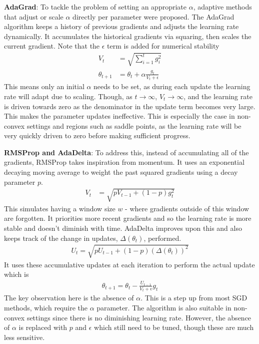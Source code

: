 \textbf{AdaGrad}: To tackle the problem of setting an appropriate $\alpha$, adaptive methods that adjust or scale $\alpha$ directly per parameter were proposed. The AdaGrad algorithm keeps a history of previous gradients and adjusts the learning rate dynamically. It accumulates the historical gradients via squaring, then scales the current gradient. Note that the $\epsilon$ term is added for numerical stability
\begin{align}
    V_t &= \sqrt{\sum_{i=1}^{t} g_i^2} \\
    \theta_{t+1} &= \theta_{t} + \alpha \frac{g_t}{V_t + \epsilon}
\end{align}
This means only an initial $\alpha$ needs to be set, as during each update the learning rate will adapt due to scaling. Though, as $t \rightarrow \infty$, $V_{t} \rightarrow \infty$, and the learning rate is driven towards zero as the denominator in the update term becomes very large.
This makes the parameter updates ineffective. This is especially the case in non-convex settings and regions such as saddle points, as the learning rate will be very quickly driven to zero before making sufficient progress.

\textbf{RMSProp and AdaDelta}: To address this, instead of accumulating all of the gradients, RMSProp takes inspiration from momentum. It uses an exponential decaying moving average to weight the past squared gradients using a decay parameter $p$.
\begin{align}
    V_t &= \sqrt{p V_{t-1} + (1 - p)g_t^2} 
\end{align}
This simulates having a window size $w$ - where gradients outside of this window are forgotten. It priorities more recent gradients and so the learning rate is more stable and doesn't diminish with time. AdaDelta improves upon this and also keeps track of the change in updates, $\Delta(\theta_t)$, performed.
\begin{align}
    U_t = \sqrt{p U_{t-1} + (1 - p)(\Delta(\theta_t))^2}
\end{align}
It uses these accumulative updates at each iteration to perform the actual update which is 
\begin{align}
    \theta_{t+1} = \theta_{t} - \frac{U_{t-1}}{V_{t} + \epsilon} g_t
\end{align}
The key observation here is the absence of $\alpha$. This is a step up from most SGD methods, which require the $\alpha$ parameter. The algorithm is also suitable in non-convex settings since there is no diminishing learning rate. However, the absence of $\alpha$ is replaced with $p$ and $\epsilon$ which still need to be tuned, though these are much less sensitive.

